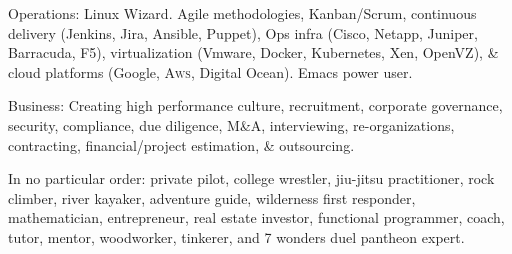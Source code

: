 \documentclass[10pt,a4paper]{article}
\begin{document}
\vspace{0.4em}
\inlineheadsection
  {Operations:}  
  {Linux Wizard. Agile methodologies, Kanban/Scrum, continuous delivery (Jenkins, Jira, Ansible, Puppet), Ops infra (Cisco, Netapp, Juniper, Barracuda, F5), virtualization (Vmware, Docker, Kubernetes, Xen, OpenVZ), \& cloud platforms (Google, {\textsc{Aws}}, Digital Ocean). Emacs power user.}

\vspace{0.4em}
\inlineheadsection
  {Business:}
  {Creating high performance culture, recruitment, corporate governance, security, compliance, due diligence, M\&A, interviewing, re-organizations, contracting, financial/project estimation, \& outsourcing. }

\spacedhrule{1.6em}{-0.5em}


\inlineheadsection
  {In no particular order:}
  {private pilot, college wrestler, jiu-jitsu practitioner, rock climber, river kayaker, adventure guide, wilderness first responder, mathematician, entrepreneur, real estate investor, functional programmer, coach, tutor, mentor, woodworker, tinkerer, and 7 wonders duel pantheon expert. }
\end{document}
